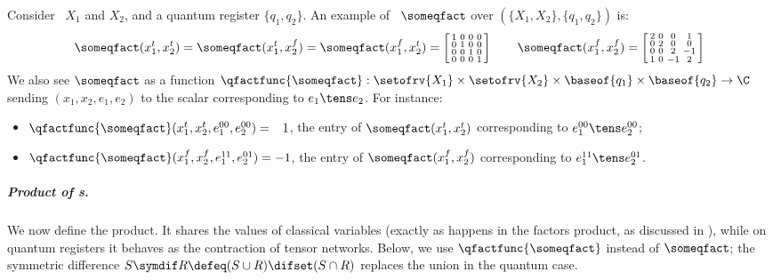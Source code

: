\begin{example}
Consider \rvs\ $X_1$ and $X_2$, and a quantum register $\{q_1,q_2\}$.
An example of \qfactor\ $\someqfact$ over $(\{X_1,X_2\},\{q_1,q_2\})$ is:
\begin{equation*}
\someqfact(x_1^t,x_2^t)
=
\someqfact(x_1^t,x_2^f)
=
\someqfact(x_1^f,x_2^t)
=
\left[\begin{smallmatrix}
	1 & 0 & 0 & 0 \\
	0 & 1 & 0 & 0 \\
	0 & 0 & 1 & 0 \\
	0 & 0 & 0 & 1 \\
\end{smallmatrix}\right]
\qquad
\someqfact(x_1^f,x_2^f)
=
\left[\begin{smallmatrix}
	2 & 0 & 0 & 1 \\
	0 & 2 & 0 & 0 \\
	0 & 0 & 2 & -1 \\
	1 & 0 & -1 & 2 \\
\end{smallmatrix}\right]
\end{equation*}
We also see $\someqfact$ as a function $\qfactfunc{\someqfact}:\setofrv{X_1}\times\setofrv{X_2}\times\baseof{q_1}\times\baseof{q_2} \to \C$ sending $(x_1,x_2,e_1,e_2)$ to the scalar corresponding to $e_1\tens e_2$.
For instance:
\begin{itemize}
\item
$\qfactfunc{\someqfact}(x_1^t,x_2^t,e^{00}_1,e^{00}_2) = \hphantom{-}1$,
the entry of $\someqfact(x_1^t,x_2^t)$ corresponding to $e^{00}_1 \tens e^{00}_2$;
\item
$\qfactfunc{\someqfact}(x_1^f,x_2^f,e^{11}_1,e^{01}_2) = -1$,
the entry of $\someqfact(x_1^f,x_2^f)$ corresponding to $e^{11}_1 \tens e^{01}_2$.
\end{itemize}
\end{example}

\subparagraph*{Product of \qfactor s.}
We now define the product.
It shares the values of classical variables (exactly as happens in the factors product, as discussed in ), while on quantum registers it behaves as the contraction of tensor networks. 
Below, we use $\qfactfunc{\someqfact}$ instead of $\someqfact$; the symmetric difference $S \symdif R \defeq (S \cup R) \difset (S \cap R)$ replaces the union in the quantum case.


